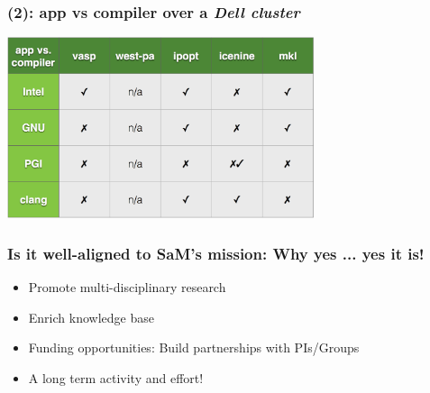 \documentclass[hyperref={pdfpagelabels=false},12pt]{beamer}
\begin{document}
\begin{frame}
\frametitle{(2): app vs compiler over a \textit{Dell cluster}}
\includegraphics[width=9cm]{table}
\end{frame}

\begin{frame}
\frametitle{Is it well-aligned to SaM's mission: Why yes ... yes it is!}
\begin{itemize}
\itemsep1em
\item 
Promote multi-disciplinary research
\item
Enrich knowledge base
\item
Funding opportunities: Build partnerships with PIs/Groups
\item
A long term activity and effort!
\end{itemize}
\end{frame}

\end{document}
